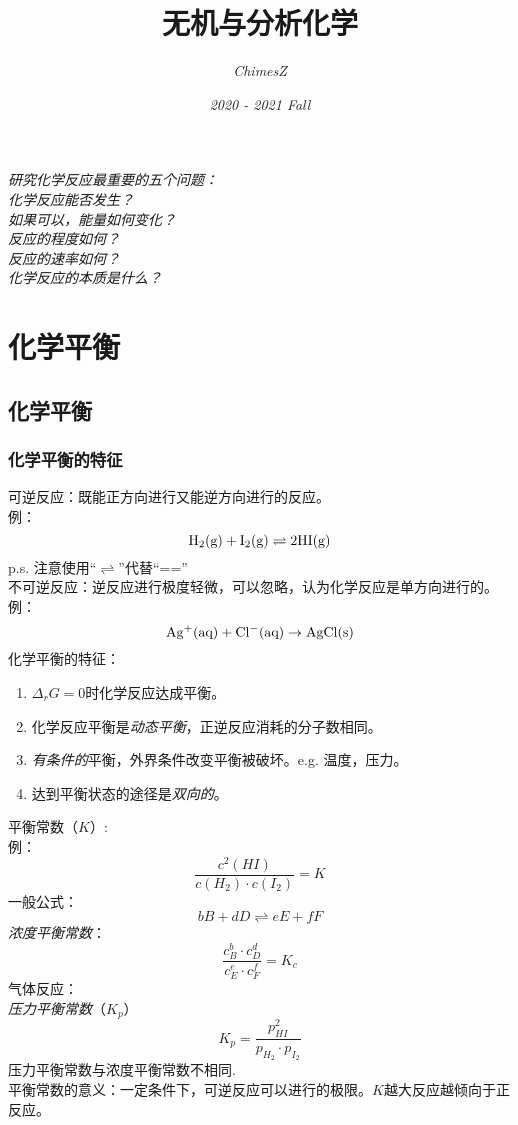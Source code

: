 \documentclass[utf8,a4paper,12pt]{ctexart}
\title{\Huge{无机与分析化学}}
\author{\emph{ChimesZ}}
\date{\emph{2020 - 2021 Fall}}
\begin{document}
\maketitle
{}
\newpage
\tableofcontents
\newpage
{}
\begin{center}
\emph{研究化学反应最重要的五个问题：\\
 化学反应能否发生？\\
 如果可以，能量如何变化？\\
 反应的程度如何？\\
 反应的速率如何？\\
 化学反应的本质是什么？\\}
\end{center}
\section{化学平衡}
\subsection{化学平衡}
\subsubsection{化学平衡的特征}
可逆反应：既能正方向进行又能逆方向进行的反应。\\
例：
\[
\rm H_{2}(g) + I_{2}(g) \rightleftharpoons 2HI(g)
\]
p.s. 注意使用“$\rightleftharpoons$”代替“==”\\
不可逆反应：逆反应进行极度轻微，可以忽略，认为化学反应是单方向进行的。\\
例：
\[
\rm Ag^{+}(aq) + Cl^{-}(aq) \rightarrow AgCl(s)
\]
化学平衡的特征：
\begin{enumerate}[(1)]
\item $\Delta_{r}G = 0$时化学反应达成平衡。
\item 化学反应平衡是\emph{动态平衡}，正逆反应消耗的分子数相同。
\item \emph{有条件的}平衡，外界条件改变平衡被破坏。e.g. 温度，压力。
\item 达到平衡状态的途径是\emph{双向的}。
\end{enumerate}

平衡常数（$K$）:\\
例：
\[
\frac{c^{2}(HI)}{c(H_{2})\cdot c(I_{2})} = K
\]
一般公式：
\[
bB + dD \rightleftharpoons eE + fF
\]
\emph{浓度平衡常数}：
\[
\frac{c^{b}_{B}\cdot c^{d}_{D}}{c^{e}_{E}\cdot c^{f}_{F}} = K_{c}
\]
气体反应：\\
\emph{压力平衡常数}（$K_{p}$）
\[
K_{p} = \frac{p^{2}_{HI}}{p_{H_{2}} \cdot p_{I_{2}}}
\]
压力平衡常数与浓度平衡常数不相同.\\
平衡常数的意义：一定条件下，可逆反应可以进行的极限。$K$越大反应越倾向于正反应。
\end{document}
